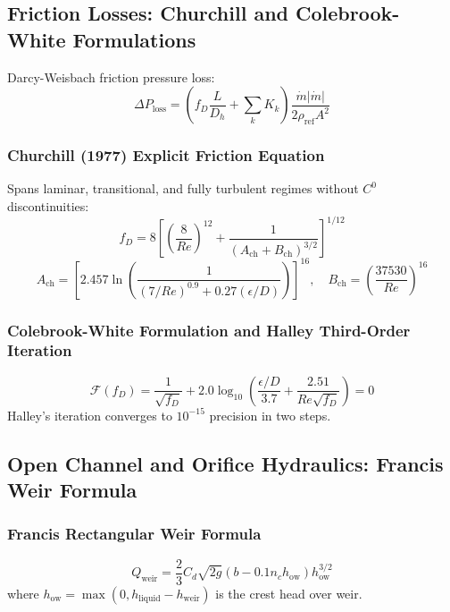 \documentclass[11pt,a4paper]{article}
\begin{document}
\subsection{Friction Losses: Churchill and Colebrook-White Formulations}

Darcy-Weisbach friction pressure loss:
\begin{equation}
\Delta P_{\text{loss}} = \left( f_D \frac{L}{D_h} + \sum_{k} K_k \right) \frac{\dot{m} |\dot{m}|}{2 \rho_{\text{ref}} A^2}
\end{equation}

\subsubsection{Churchill (1977) Explicit Friction Equation}
Spans laminar, transitional, and fully turbulent regimes without $C^0$ discontinuities:
\begin{equation}
f_D = 8 \left[ \left(\frac{8}{Re}\right)^{12} + \frac{1}{(A_{\text{ch}} + B_{\text{ch}})^{3/2}} \right]^{1/12}
\end{equation}
\begin{equation}
A_{\text{ch}} = \left[ 2.457 \ln \left( \frac{1}{(7/Re)^{0.9} + 0.27 (\epsilon/D)} \right) \right]^{16}, \quad B_{\text{ch}} = \left( \frac{37530}{Re} \right)^{16}
\end{equation}

\subsubsection{Colebrook-White Formulation and Halley Third-Order Iteration}
\begin{equation}
\mathcal{F}(f_D) = \frac{1}{\sqrt{f_D}} + 2.0 \log_{10}\left( \frac{\epsilon/D}{3.7} + \frac{2.51}{Re \sqrt{f_D}} \right) = 0
\end{equation}
Halley's iteration converges to $10^{-15}$ precision in two steps.

\subsection{Open Channel and Orifice Hydraulics: Francis Weir Formula}

\subsubsection{Francis Rectangular Weir Formula}
\begin{equation}
Q_{\text{weir}} = \frac{2}{3} C_d \sqrt{2g} \left( b - 0.1 n_c h_{\text{ow}} \right) h_{\text{ow}}^{3/2}
\end{equation}
where $h_{\text{ow}} = \max(0, h_{\text{liquid}} - h_{\text{weir}})$ is the crest head over weir.
\end{document}
